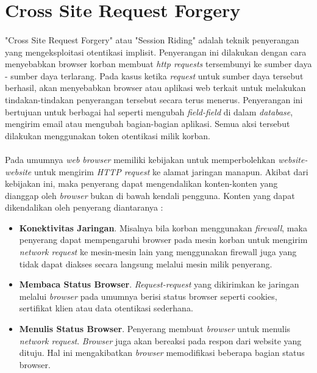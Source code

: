 \section{Cross Site Request Forgery}
\paragraph{}"Cross Site Request Forgery" atau "Session Riding" adalah teknik penyerangan yang mengeksploitasi otentikasi implisit. Penyerangan ini dilakukan dengan cara menyebabkan browser korban membuat \textit{http requests} tersembunyi ke sumber daya - sumber daya terlarang. Pada kasus ketika \textit{request} untuk sumber daya tersebut berhasil, akan menyebabkan browser atau aplikasi web terkait untuk melakukan tindakan-tindakan penyerangan tersebut secara terus menerus. Penyerangan ini bertujuan untuk berbagai hal seperti mengubah \textit{field-field} di dalam \textit{database}, mengirim email atau mengubah bagian-bagian aplikasi. Semua aksi tersebut dilakukan menggunakan token otentikasi milik korban. \cite{barth08csrf}

\paragraph{}Pada umumnya \textit{web browser} memiliki kebijakan untuk memperbolehkan \textit{website-website} untuk mengirim \textit{HTTP request} ke alamat jaringan manapun. Akibat dari kebijakan ini, maka penyerang dapat mengendalikan konten-konten yang dianggap oleh \textit{browser} bukan di bawah kendali pengguna. Konten yang dapat dikendalikan oleh penyerang diantaranya : \cite{barth08csrf}
\begin{itemize}
	\item \textbf{Konektivitas Jaringan}. Misalnya bila korban menggunakan \textit{firewall}, maka penyerang dapat mempengaruhi browser pada mesin korban untuk mengirim \textit{network request} ke mesin-mesin lain yang menggunakan firewall juga yang tidak dapat diakses secara langsung melalui mesin milik penyerang.
	\item \textbf{Membaca Status Browser}. \textit{Request-request} yang dikirimkan ke jaringan melalui \textit{browser} pada umumnya berisi status browser seperti cookies, sertifikat klien atau data otentikasi sederhana.
	\item\textbf{ Menulis Status Browser}. Penyerang membuat \textit{browser} untuk menulis \textit{network request}. \textit{Browser} juga akan bereaksi pada respon dari website yang dituju. Hal ini mengakibatkan \textit{browser} memodifikasi beberapa bagian status browser.
\end{itemize}

